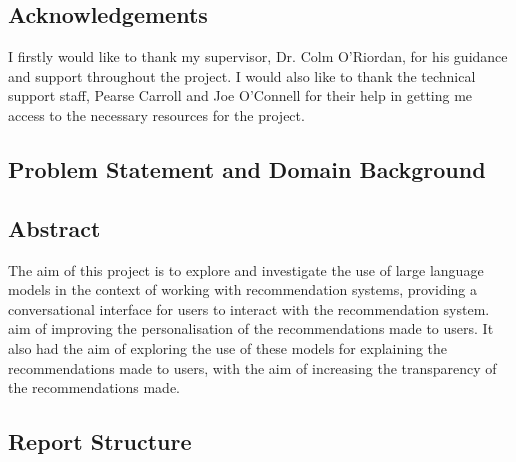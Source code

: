 





\subsection{Acknowledgements}
\label{sec:acknowledgements}
I firstly would like to thank my supervisor, Dr. Colm O'Riordan, for his guidance and support throughout the project.
I would also like to thank the technical support staff, Pearse Carroll and Joe O'Connell for their help in getting me access to the necessary resources for the project.


\subsection{Problem Statement and Domain Background}
\label{sec:domain_background}

\subsection{Abstract}
\label{sec:abstract}
The aim of this project is to explore and investigate the use of large language models in the context of working with recommendation systems, providing a conversational interface for users to interact with the recommendation system.
 aim of improving the personalisation of the recommendations made to users.
It also had the aim of exploring the use of these models for explaining the recommendations made to users, with the aim of increasing the transparency of the recommendations made.


\subsection{Report Structure}
\label{sec:report_structure}





